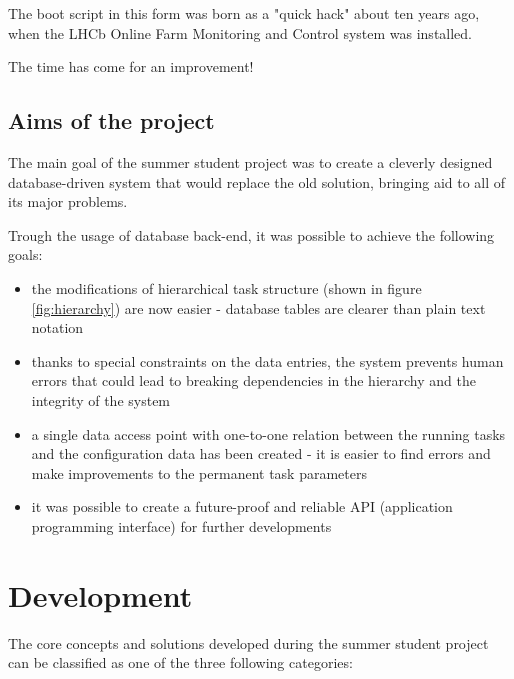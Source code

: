 \documentclass{customization}
\begin{document}
\noindent
The boot script in this form was born as a "quick hack" about ten years ago, when the LHCb Online Farm Monitoring and Control system was installed. 
\newline

\noindent
The time has come for an improvement!


\subsection{Aims of the project}
\hspace{0.6cm}

The main goal of the summer student project was to create a cleverly designed database-driven system that would replace the old solution, bringing aid to all of its major problems.
\newline 

\newpage
\noindent
Trough the usage of database back-end, it was possible to achieve the following goals:

\begin{itemize}
    \item the modifications of hierarchical task structure (shown in figure \ref{fig:hierarchy}) are now easier - database tables are clearer than plain text notation
    \item thanks to special constraints on the data entries, the system prevents human errors that could lead to breaking dependencies in the hierarchy and the integrity of the system
    \item a single data access point with one-to-one relation between the running tasks and the configuration data has been created - it is easier to find errors and make improvements to the permanent task parameters
    \item it was possible to create a future-proof and reliable API (application programming interface) for further developments
\end{itemize}


\section{Development}
\hspace{0.6cm}

The core concepts and solutions developed during the summer student project can be classified as one of the three following categories:
\end{document}
